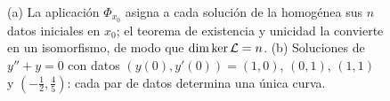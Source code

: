 \begin{figure}[ht]
\caption{(a) La aplicación $\Phi_{x_0}$ asigna a cada solución de la
homogénea sus $n$ datos iniciales en $x_0$; el teorema de existencia y
unicidad la convierte en un isomorfismo, de modo que $\dim\operatorname{ker}\mathcal{L}=n$.
(b) Soluciones de $y''+y=0$ con datos $(y(0),y'(0))=(1,0)$, $(0,1)$,
$(1,1)$ y $(-\tfrac12,\tfrac45)$: cada par de datos determina una única curva.}
\label{fig:isomorfismo}
\end{figure}
